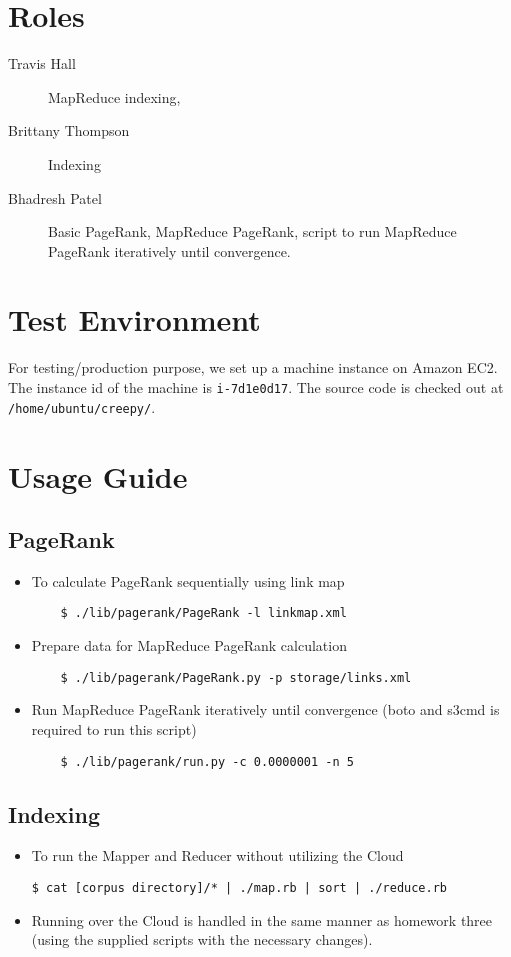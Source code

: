 \documentclass[letterpaper,11pt,twoside]{article}
\begin{document}
\section{Roles}
\begin{description}
 \item[Travis Hall] MapReduce indexing,
 \item[Brittany Thompson] Indexing
 \item[Bhadresh Patel] Basic PageRank, MapReduce PageRank, script to run MapReduce PageRank iteratively until convergence.
\end{description}

\section{Test Environment}
For testing/production purpose, we set up a machine instance on Amazon EC2. The instance id of the machine is \texttt{i-7d1e0d17}. The source code is checked out at \texttt{/home/ubuntu/creepy/}.

\section{Usage Guide}

\subsection{PageRank}
\begin{itemize}
	\item To calculate PageRank sequentially using link map
\begin{verbatim}
	$ ./lib/pagerank/PageRank -l linkmap.xml
\end{verbatim}

	\item Prepare data for MapReduce PageRank calculation
\begin{verbatim}
	$ ./lib/pagerank/PageRank.py -p storage/links.xml
\end{verbatim}
	
	\item Run MapReduce PageRank iteratively until convergence (boto and s3cmd is required to run this script)
\begin{verbatim}
	$ ./lib/pagerank/run.py -c 0.0000001 -n 5
\end{verbatim}
\end{itemize}

\subsection{Indexing}
\begin{itemize}
   \item To run the Mapper and Reducer without utilizing the Cloud
   \begin{verbatim}
$ cat [corpus directory]/* | ./map.rb | sort | ./reduce.rb
   \end{verbatim}
   \item Running over the Cloud is handled in the same manner as homework three (using the supplied scripts with the necessary changes).
\end{itemize}
\end{document}
